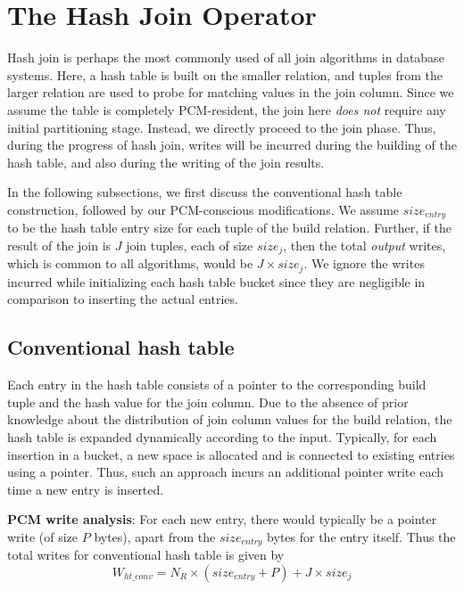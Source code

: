 \section{The Hash Join Operator}
\label{hj}
Hash join is perhaps the most commonly used of all join algorithms in
database systems. Here, a hash table is built on the smaller relation,
and tuples from the larger relation are used to probe for matching values
in the join column. Since we assume the table is completely PCM-resident, the join here \emph{does not} require any initial partitioning stage. Instead, we directly proceed to the join phase. Thus, during the progress of hash join,
writes will be incurred during the building of the hash table, and also
during the writing of the join results.

In the following subsections, we first discuss the conventional hash table
construction, followed by our PCM-conscious modifications. We assume $size_{entry}$
to be the hash table entry size for each tuple of the build relation.
Further, if the result of the join is $J$ join tuples, each of size
$size_{j}$, then the total \emph{output} writes, which is common to all
algorithms, would be $J \times size_{j}$. We ignore the writes incurred while initializing each hash table bucket since they are negligible in comparison to inserting the actual entries.

\subsection{Conventional hash table}
Each entry in the hash table consists of a pointer to the corresponding
build tuple and the hash value for the join column. Due to the
absence of prior knowledge about the distribution of join column values
for the build relation, the hash table is expanded dynamically according
to the input. Typically, for each insertion in a bucket, a new space is
allocated and is connected to existing entries using a pointer. Thus,
such an approach incurs an additional pointer write each time a new
entry is inserted.

\textbf{PCM write analysis}: 
For each new entry, there would typically be a pointer write (of size $P$ bytes),
apart from the $size_{entry}$ bytes for the entry itself.  Thus the total writes 
for conventional hash table is given by
\begin{equation}\label{eq:ht_conv}
  W_{ht\_conv} = N_R \times (size_{entry} + P) + J \times size_{j}
\end{equation}


